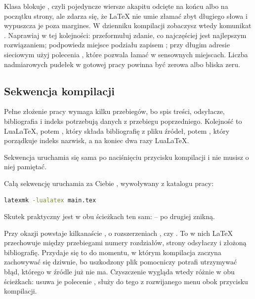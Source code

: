Klasa blokuje , czyli pojedyncze wiersze akapitu odcięte na końcu albo na początku strony, ale zdarza się, że LaTeX nie umie złamać zbyt długiego słowa i wypuszcza je poza margines. W dzienniku kompilacji zobaczysz wtedy komunikat . Naprawiaj w tej kolejności: przeformułuj zdanie, co najczęściej jest najlepszym rozwiązaniem; podpowiedz miejsce podziału zapisem ; przy długim adresie sieciowym użyj polecenia , które pozwala łamać w sensownych miejscach. Liczba nadmiarowych pudełek w gotowej pracy powinna być zerowa albo bliska zeru.

\subsection{Sekwencja kompilacji}

Pełne złożenie pracy wymaga kilku przebiegów, bo spis treści, odsyłacze, bibliografia i indeks potrzebują danych z przebiegu poprzedniego. Kolejność to LuaLaTeX, potem , który składa bibliografię z pliku źródeł, potem , który porządkuje indeks nazwisk, a na koniec dwa razy LuaLaTeX.

 Sekwencja uruchamia się sama po naciśnięciu przycisku kompilacji i nie musisz o niej pamiętać.

 Całą sekwencję uruchamia za Ciebie , wywoływany z katalogu pracy:

\begin{lstlisting}[language=bash,numbers=none]
latexmk -lualatex main.tex
\end{lstlisting}

Skutek praktyczny jest w obu ścieżkach ten sam:  -- po drugiej znikną.

Przy okazji powstaje kilkanaście , o rozszerzeniach ,  czy . To w nich LaTeX przechowuje między przebiegami numery rozdziałów, strony odsyłaczy i złożoną bibliografię. Przydaje się to do momentu, w którym kompilacja zaczyna zachowywać się dziwnie, bo uszkodzony plik pomocniczy potrafi utrzymywać błąd, którego w źródle już nie ma. Czyszczenie wygląda wtedy różnie w obu ścieżkach:  usuwa je polecenie ,  służy do tego  z rozwijanego menu obok przycisku kompilacji.

